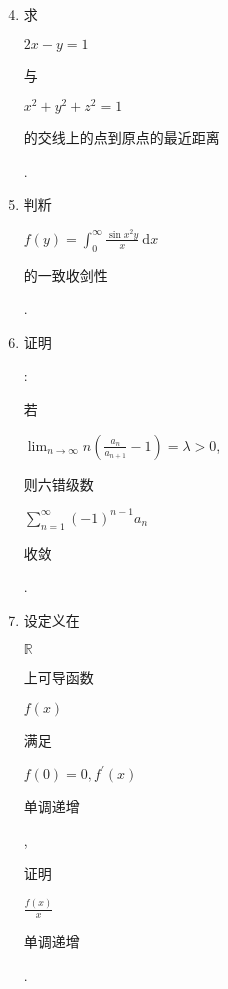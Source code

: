 \documentclass[10pt]{article}
\begin{document}
\begin{enumerate}
  \setcounter{enumi}{3}
  \item \begin{CJK}{UTF8}{mj}求\end{CJK} $2 x-y=1$ \begin{CJK}{UTF8}{mj}与\end{CJK} $x^{2}+y^{2}+z^{2}=1$ \begin{CJK}{UTF8}{mj}的交线上的点到原点的最近距离\end{CJK}.

  \item \begin{CJK}{UTF8}{mj}判䉼\end{CJK} $f(y)=\int_{0}^{\infty} \frac{\sin x^{2} y}{x} \mathrm{~d} x$ \begin{CJK}{UTF8}{mj}的一致收剑性\end{CJK}.

  \item \begin{CJK}{UTF8}{mj}证明\end{CJK}: \begin{CJK}{UTF8}{mj}若\end{CJK} $\lim _{n \rightarrow \infty} n\left(\frac{a_{n}}{a_{n+1}}-1\right)=\lambda>0$, \begin{CJK}{UTF8}{mj}则六错级数\end{CJK} $\sum_{n=1}^{\infty}(-1)^{n-1} a_{n}$ \begin{CJK}{UTF8}{mj}收敛\end{CJK}.

  \item \begin{CJK}{UTF8}{mj}设定义在\end{CJK} $\mathbb{R}$ \begin{CJK}{UTF8}{mj}上可导函数\end{CJK} $f(x)$ \begin{CJK}{UTF8}{mj}满足\end{CJK} $f(0)=0, f^{\prime}(x)$ \begin{CJK}{UTF8}{mj}单调递增\end{CJK}, \begin{CJK}{UTF8}{mj}证明\end{CJK} $\frac{f(x)}{x}$ \begin{CJK}{UTF8}{mj}单调递增\end{CJK}.


\end{enumerate}
\end{document}

